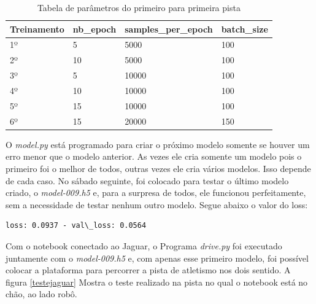 \begin{table}[H]
\centering
\caption{ Tabela de parâmetros do primeiro para primeira pista}
\label{parametros1}
\begin{tabular}{|l|l|l|l|}
\hline
\textbf{Treinamento} & \textbf{nb\_epoch} & \textbf{samples\_per\_epoch} & \textbf{batch\_size} \\ \hline
1º        & 5         & 5000                & 100         \\ 
2º        & 10        & 5000                & 100         \\ 
3º        & 5         & 10000               & 100         \\ 
4º        & 10        & 10000               & 100         \\ 
5º        & 15        & 10000               & 100         \\ 
6º        & 15        & 20000               & 150         \\ \hline
\end{tabular}
\end{table}

O \textit{model.py} está programado para criar o próximo modelo somente se houver um erro menor que o modelo anterior. As vezes ele cria somente um modelo pois o primeiro foi o melhor de todos, outras vezes ele cria vários modelos. Isso depende de cada caso.
No sábado seguinte, foi colocado para testar o último modelo criado, o \textit{model-009.h5} e, para a surpresa de todos, ele funcionou perfeitamente, sem a necessidade de testar nenhum outro modelo. Segue abaixo o valor do loss:

\begin{lstlisting}
loss: 0.0937 - val\_loss: 0.0564
\end{lstlisting}

Com o notebook conectado ao Jaguar, o Programa \textit{drive.py} foi executado juntamente com o \textit{model-009.h5} e, com apenas esse primeiro modelo, foi possível colocar a plataforma para percorrer a pista de atletismo nos dois sentido. A figura \ref{testejaguar} Mostra o teste realizado na pista no qual o notebook está no chão, ao lado robô.

